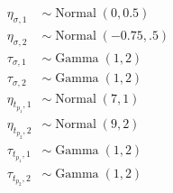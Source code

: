 \documentclass{article}
\newcommand{\op}{\operatorname}
\begin{document}
\begin{align*}
 \eta_{\sigma ,1} & \sim \op{Normal}(0, 0.5)\\
 \eta_{\sigma ,2} & \sim \op{Normal}(-0.75, .5)\\
 \tau_{\sigma ,1} & \sim \op{Gamma}(1, 2)\\
 \tau_{\sigma ,2} & \sim \op{Gamma}(1, 2)\\
 \eta_{t_{p_1},1} & \sim \op{Normal}(7, 1)\\
 \eta_{t_{p_2},2} & \sim \op{Normal}(9, 2)\\
 \tau_{t_{p_1},1} & \sim \op{Gamma}(1, 2)\\
 \tau_{t_{p_2},2} & \sim \op{Gamma}(1, 2)
 \end{align*} 
 
\end{document}
